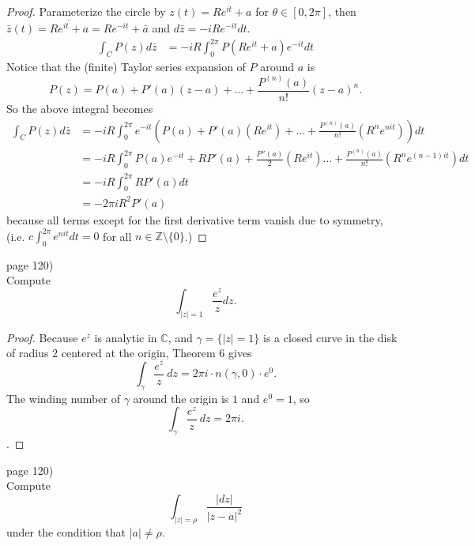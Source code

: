 \documentclass{article}
\newenvironment{problem}[2][Problem]{\begin{trivlist}
\item[\hskip \labelsep {\bfseries #1}\hskip \labelsep {\bfseries #2.}]}{\end{trivlist}}
\begin{document}
\begin{proof}
  Parameterize the circle by $z(t) = Re^{it} + a$ for $\theta \in [0, 2\pi]$,
  then $\bar{z}(t) = \overline{Re^{it} + a} = Re^{-it} + \bar{a}$ and
  $d\bar{z} = -iRe^{-it} dt$.
  \begin{align*}
    \int_C P(z) d\bar{z} &= -iR\int_{0}^{2\pi} P(Re^{it} + a)e^{-it} dt
  \end{align*}
  Notice that the (finite) Taylor series expansion of $P$ around $a$ is \[
    P(z) = P(a) + P'(a)(z-a) + \hdots + \frac{P^{(n)}(a)}{n!}(z - a)^n.
  \]
  So the above integral becomes \begin{align*}
    \int_C P(z) d\bar{z} &= -iR\int_{0}^{2\pi} e^{-it} \left(P(a) + P'(a)(Re^{it}) + \hdots + \frac{P^{(n)}(a)}{n!}(R^{n}e^{nit})\right) dt \\
    &= -iR\int_{0}^{2\pi} P(a)e^{-it} + RP'(a) + \frac{P''(a)}{2}(Re^{it}) \hdots + \frac{P^{(n)}(a)}{n!}(R^{n}e^{(n - 1)it}) dt \\
    &= -iR\int_{0}^{2\pi} RP'(a) dt \\
    &= -2\pi iR^2P'(a)
  \end{align*} because all terms except for the first derivative term vanish due
  to symmetry, (i.e. $c\int_0^{2\pi}e^{nit} dt = 0$ for all
  $n \in \mathbb{Z} \setminus \{0\}$.)
\end{proof}
\pagebreak

\begin{problem}{1} (page 120) \\
  Compute \[
    \int_{|z| = 1} \frac{e^z}{z} dz.
  \]
\end{problem}

\begin{proof}
  Because $e^z$ is analytic in $\mathbb{C}$, and $\gamma = \{|z| = 1\}$ is a
  closed curve in the disk of radius $2$ centered at the origin, Theorem 6 gives
  \[
    \int_\gamma \frac{e^z}{z}\ dz = 2\pi i \cdot n(\gamma, 0) \cdot e^0.
  \]
  The winding number of $\gamma$ around the origin is $1$ and $e^0 = 1$, so
  \[
    \int_\gamma \frac{e^z}{z}\ dz = 2\pi i.
  \].
\end{proof}

\pagebreak

\begin{problem}{3} (page 120) \\
  Compute \[
    \int_{|z|=\rho}\frac{|dz|}{|z - a|^2}
  \] under the condition that $|a| \not= \rho$.
\end{problem}
\end{document}
